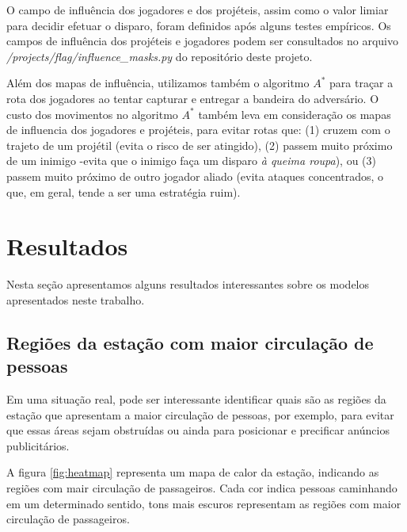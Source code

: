 \documentclass[preprint,12pt]{elsarticle}
\begin{document}
O campo de influência dos jogadores e dos projéteis, assim como o valor limiar para decidir efetuar o disparo, foram definidos após alguns testes empíricos. Os campos de influência dos projéteis e jogadores podem ser consultados no arquivo \textit{/projects/flag/influence\_masks.py} do repositório deste projeto.

Além dos mapas de influência, utilizamos também o algoritmo $A^*$ para traçar a rota dos jogadores ao tentar capturar e entregar a bandeira do adversário. O custo dos movimentos no algoritmo $A^*$ também leva em consideração os mapas de influencia dos jogadores e projéteis, para evitar rotas que: (1) cruzem com o trajeto de um projétil (evita o risco de ser atingido), (2) passem muito próximo de um inimigo -evita que o inimigo faça um disparo \textit{à queima roupa}), ou (3) passem muito próximo de outro jogador aliado (evita ataques concentrados, o que, em geral, tende a ser uma estratégia ruim).

\section{Resultados}
\label{sec:resultados}

Nesta seção apresentamos alguns resultados interessantes sobre os modelos apresentados neste trabalho.

\subsection{Regiões da estação com maior circulação de pessoas}
\label{subsec:metro_heatmap}

Em uma situação real, pode ser interessante identificar quais são as regiões da estação que apresentam a maior circulação de pessoas, por exemplo, para evitar que essas áreas sejam obstruídas ou ainda para posicionar e precificar anúncios publicitários.

A figura \ref{fig:heatmap} representa um mapa de calor da estação, indicando as regiões com mair circulação de passageiros. Cada cor indica pessoas caminhando em um determinado sentido, tons mais escuros representam as regiões com maior circulação de passageiros.
\end{document}
